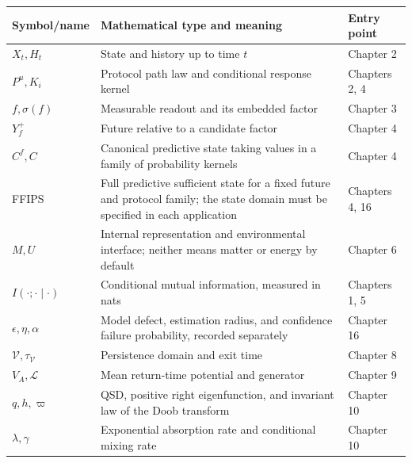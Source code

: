 \documentclass[
  english,
  11pt,
  oneside]{book}
\newcounter{none} %
\begin{document}
{\def\LTcaptype{none} %
\begin{longtable}[]{@{}
  >{\raggedright\arraybackslash}p{}
  >{\raggedright\arraybackslash}p{}
  >{\raggedright\arraybackslash}p{}@{}}
\toprule\noalign{}
\begin{minipage}[b]{\linewidth}\raggedright
Symbol/name
\end{minipage} & \begin{minipage}[b]{\linewidth}\raggedright
Mathematical type and meaning
\end{minipage} & \begin{minipage}[b]{\linewidth}\raggedright
Entry point
\end{minipage} \\
\midrule\noalign{}
\endhead
\bottomrule\noalign{}
\endlastfoot
\(X_t,H_t\) & State and history up to time \(t\) & Chapter 2 \\
\(P^u,K_i\) & Protocol path law and conditional response kernel & Chapters 2, 4 \\
\(f,\sigma(f)\) & Measurable readout and its embedded factor & Chapter 3 \\
\(Y_f^+\) & Future relative to a candidate factor & Chapter 4 \\
\(C^f,C\) & Canonical predictive state taking values in a family of probability kernels & Chapter 4 \\
FFIPS & Full predictive sufficient state for a fixed future and protocol family; the state domain must be specified in each application & Chapters 4, 16 \\
\(M,U\) & Internal representation and environmental interface; neither means matter or energy by default & Chapter 6 \\
\(I(\cdot;\cdot\mid\cdot)\) & Conditional mutual information, measured in nats & Chapters 1, 5 \\
\(\epsilon,\eta,\alpha\) & Model defect, estimation radius, and confidence failure probability, recorded separately & Chapter 16 \\
\(\mathcal V,\tau_{\mathcal V}\) & Persistence domain and exit time & Chapter 8 \\
\(V_A,\mathcal L\) & Mean return-time potential and generator & Chapter 9 \\
\(q,h,\varpi\) & QSD, positive right eigenfunction, and invariant law of the Doob transform & Chapter 10 \\
\(\lambda,\gamma\) & Exponential absorption rate and conditional mixing rate & Chapter 10 \\

\end{longtable}}
\end{document}
